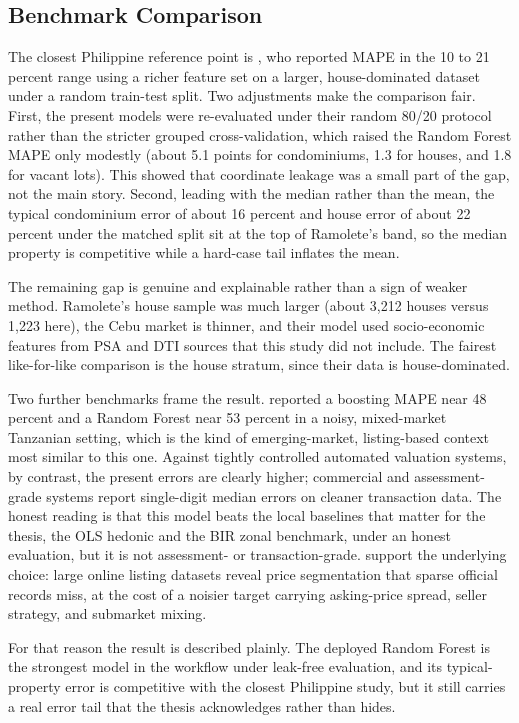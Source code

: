 \subsection{Benchmark Comparison}\label{benchmark-comparison}

The closest Philippine reference point is \textcite{ramolete2023}, who reported MAPE in the 10 to 21 percent range using a richer feature set on a larger, house-dominated dataset under a random train-test split. Two adjustments make the comparison fair. First, the present models were re-evaluated under their random 80/20 protocol rather than the stricter grouped cross-validation, which raised the Random Forest MAPE only modestly (about 5.1 points for condominiums, 1.3 for houses, and 1.8 for vacant lots). This showed that coordinate leakage was a small part of the gap, not the main story. Second, leading with the median rather than the mean, the typical condominium error of about 16 percent and house error of about 22 percent under the matched split sit at the top of Ramolete's band, so the median property is competitive while a hard-case tail inflates the mean.

The remaining gap is genuine and explainable rather than a sign of weaker method. Ramolete's house sample was much larger (about 3{,}212 houses versus 1{,}223 here), the Cebu market is thinner, and their model used socio-economic features from PSA and DTI sources that this study did not include. The fairest like-for-like comparison is the house stratum, since their data is house-dominated.

Two further benchmarks frame the result. \textcite{nyanda2024} reported a boosting MAPE near 48 percent and a Random Forest near 53 percent in a noisy, mixed-market Tanzanian setting, which is the kind of emerging-market, listing-based context most similar to this one. Against tightly controlled automated valuation systems, by contrast, the present errors are clearly higher; commercial and assessment-grade systems report single-digit median errors on cleaner transaction data. The honest reading is that this model beats the local baselines that matter for the thesis, the OLS hedonic and the BIR zonal benchmark, under an honest evaluation, but it is not assessment- or transaction-grade. \textcite{sousa2024} support the underlying choice: large online listing datasets reveal price segmentation that sparse official records miss, at the cost of a noisier target carrying asking-price spread, seller strategy, and submarket mixing.

For that reason the result is described plainly. The deployed Random Forest is the strongest model in the workflow under leak-free evaluation, and its typical-property error is competitive with the closest Philippine study, but it still carries a real error tail that the thesis acknowledges rather than hides.
